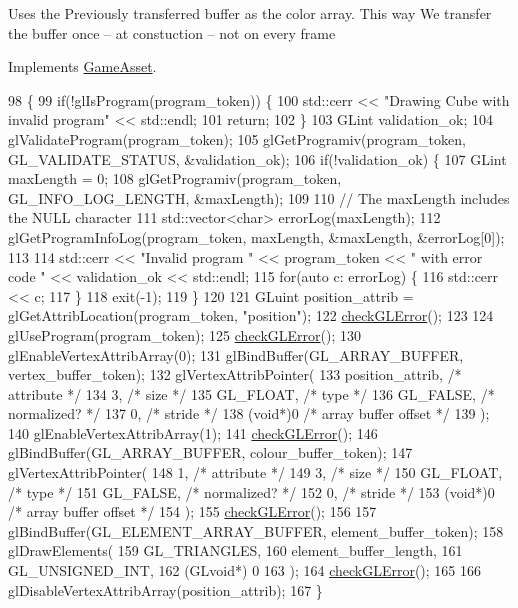 Uses the Previously transferred buffer as the color array. This way We transfer the buffer once -- at constuction -- not on every frame

Implements \hyperlink{classGameAsset_a961aa51ca0a9961fc584c0b5d5431300}{Game\+Asset}.


\begin{DoxyCode}
98                                          \{
99   \textcolor{keywordflow}{if}(!glIsProgram(program\_token)) \{
100     std::cerr << \textcolor{stringliteral}{"Drawing Cube with invalid program"} << std::endl;
101     \textcolor{keywordflow}{return};
102   \}
103   GLint validation\_ok;
104   glValidateProgram(program\_token);
105   glGetProgramiv(program\_token, GL\_VALIDATE\_STATUS, &validation\_ok);
106   \textcolor{keywordflow}{if}(!validation\_ok) \{
107     GLint maxLength = 0;
108     glGetProgramiv(program\_token, GL\_INFO\_LOG\_LENGTH, &maxLength);
109 
110     \textcolor{comment}{// The maxLength includes the NULL character}
111     std::vector<char> errorLog(maxLength);
112     glGetProgramInfoLog(program\_token, maxLength, &maxLength, &errorLog[0]);
113 
114     std::cerr << \textcolor{stringliteral}{"Invalid program "} << program\_token << \textcolor{stringliteral}{" with error code "} << validation\_ok << std::endl;
115     \textcolor{keywordflow}{for}(\textcolor{keyword}{auto} c: errorLog) \{
116       std::cerr << c;
117     \}
118     exit(-1);
119   \}
120 
121   GLuint position\_attrib = glGetAttribLocation(program\_token, \textcolor{stringliteral}{"position"});
122   \hyperlink{CubeAsset_8cc_a75f201b0e53e68726854997957322b8d}{checkGLError}();
123 
124   glUseProgram(program\_token);
125   \hyperlink{CubeAsset_8cc_a75f201b0e53e68726854997957322b8d}{checkGLError}();
130   glEnableVertexAttribArray(0);
131   glBindBuffer(GL\_ARRAY\_BUFFER, vertex\_buffer\_token);
132   glVertexAttribPointer(
133     position\_attrib,        \textcolor{comment}{/* attribute */}
134     3,        \textcolor{comment}{/* size */}
135     GL\_FLOAT,   \textcolor{comment}{/* type */}
136     GL\_FALSE,   \textcolor{comment}{/* normalized? */}
137     0,        \textcolor{comment}{/* stride */}
138     (\textcolor{keywordtype}{void}*)0    \textcolor{comment}{/* array buffer offset */}
139   );
140   glEnableVertexAttribArray(1);
141   \hyperlink{CubeAsset_8cc_a75f201b0e53e68726854997957322b8d}{checkGLError}();
146   glBindBuffer(GL\_ARRAY\_BUFFER, colour\_buffer\_token);
147   glVertexAttribPointer(
148     1,        \textcolor{comment}{/* attribute */}
149     3,        \textcolor{comment}{/* size */}
150     GL\_FLOAT,   \textcolor{comment}{/* type */}
151     GL\_FALSE,   \textcolor{comment}{/* normalized? */}
152     0,        \textcolor{comment}{/* stride */}
153     (\textcolor{keywordtype}{void}*)0    \textcolor{comment}{/* array buffer offset */}
154   );
155   \hyperlink{CubeAsset_8cc_a75f201b0e53e68726854997957322b8d}{checkGLError}();
156 
157   glBindBuffer(GL\_ELEMENT\_ARRAY\_BUFFER, element\_buffer\_token);
158   glDrawElements(
159     GL\_TRIANGLES,
160     element\_buffer\_length,
161     GL\_UNSIGNED\_INT,
162     (GLvoid*) 0
163   );
164   \hyperlink{CubeAsset_8cc_a75f201b0e53e68726854997957322b8d}{checkGLError}();
165 
166   glDisableVertexAttribArray(position\_attrib);
167 \}
\end{DoxyCode}

